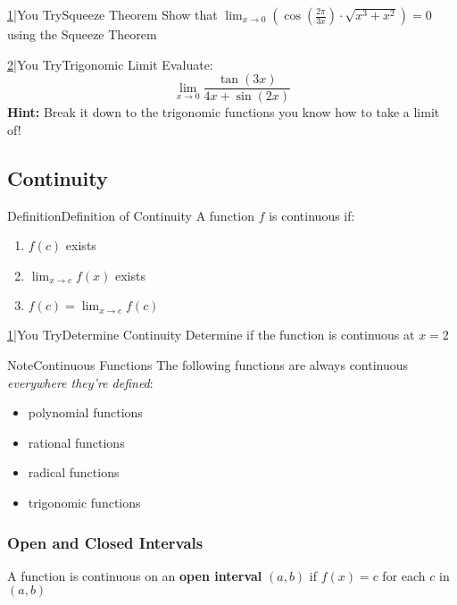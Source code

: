 \documentclass{MathNotes}
\newenvironment{definition}[1]{\begin{RedBox}{Definition}{#1}}{\end{RedBox}}
\newenvironment{note}[1]{\begin{YellowBox}{Note}{#1}}{\end{YellowBox}}
\newenvironment{practice}[2]{\begin{PurpleBox}{\texorpdfstring{#1}\Big|You Try}{#2}}{\end{PurpleBox}}
\begin{document}
\begin{practice}{\hyperref[ans:1.2.2-1]{1}}{Squeeze Theorem}\label{prac:1.2.2-1}
	Show that
	$\displaystyle\lim_{x\to 0}(\cos(\frac{2\pi}{3x})\cdot\sqrt{x^3+x^2})=0$
	using the Squeeze Theorem
\end{practice}
\begin{practice}{\hyperref[ans:1.2.2-2]{2}}{Trigonomic Limit}\label{prac:1.2.2-2}
	Evaluate:
	$$\lim_{x\to 0}\frac{\tan(3x)}{4x+\sin(2x)}$$
	\textbf{Hint:} Break it down to the trigonomic functions you know
	how to take a limit of!
\end{practice}

\subsection{Continuity}

\begin{multicols}{2}
	\begin{definition}{Definition of Continuity}
		A function $f$ is continuous if:
		\begin{enumerate}
			\item $f(c)$ exists
			\item $\lim_{x\to c}f(x)$ exists
			\item $f(c)=\lim_{x\to c}f(c)$
		\end{enumerate}
	\end{definition}

	\begin{practice}{\hyperref[ans:1.3-1]{1}}{Determine Continuity}\label{prac:1.3-1}
		Determine if the function is continuous at $x=2$
	\end{practice}
\end{multicols}

\begin{note}{Continuous Functions}
	The following functions are always continuous \textit{everywhere
		they're defined}:
	\begin{itemize}
		\item polynomial functions
		\item rational functions
		\item radical functions
		\item trigonomic functions
	\end{itemize}
\end{note}

\subsubsection{Open and Closed Intervals}\label{sec:1.3.1}
A function is continuous on an \textbf{open interval} $(a, b)$ if
$f(x)=c$ for each $c$ in $(a, b)$
\end{document}
